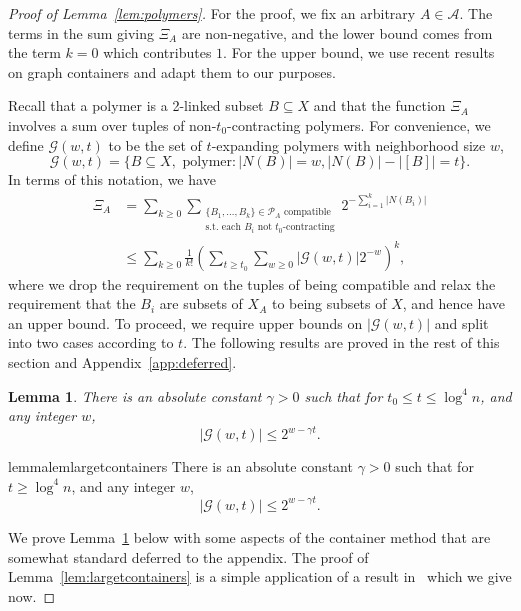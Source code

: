 \documentclass[11pt,letterpaper]{amsart}
\newtheorem{lemma}[theorem]{Lemma}
\theoremstyle{definition}
\renewcommand{\subset}{\subseteq}
\begin{document}
\begin{proof}[Proof of Lemma~\ref{lem:polymers}]
For the proof, we fix an arbitrary $A\in\mathcal A$. 
The terms in the sum giving $\Xi_A$ are non-negative, and the lower bound comes from the term $k=0$ which contributes $1$.
For the upper bound, we use recent results on graph containers and adapt them to our purposes.

Recall that a polymer is a 2-linked subset $B\subset X$ and that the function $\Xi_A$ involves a sum over tuples of non-$t_0$-contracting polymers. 
For convenience, we define $\mathcal{G}(w,t)$ to be the set of $t$-expanding polymers with neighborhood size $w$,
\[
\mathcal{G}(w,t) = \{B \subseteq X,\text{ polymer}:|N(B)| = w, |N(B)| - |[B]| = t\}.
\]
In terms of this notation, we have
\begin{align}
 \Xi_A &= \sum_{k\ge 0}\sum_{\substack{\{B_1,\dotsc,B_k\}\in\mathcal{P}_A\text{ compatible}\\\text{s.t.\ each $B_i$ not $t_0$-contracting}}} 2^{-\sum_{i=1}^k |N(B_i)|}
 \\&\le \sum_{k\ge 0}\frac{1}{k!}\left(\sum_{t\ge t_0}\sum_{w\ge 0}|\mathcal{G}(w,t)|2^{-w}\right)^k,
\end{align}
where we drop the requirement on the tuples of being compatible and relax the requirement that the $B_i$ are subsets of $X_A$ to being subsets of $X$, and hence have an upper bound. 
To proceed, we require upper bounds on $|\mathcal{G}(w,t)|$ and split into two cases according to $t$. The following results are proved in the rest of this section and Appendix~\ref{app:deferred}.

\begin{lemma}\label{lem:smalltcontainers}
There is an absolute constant $\gamma>0$ such that for $t_0\leq t \leq \log^4 n$, and any integer $w$,
\[
|\mathcal{G}(w,t)| \leq 2^{w - \gamma t}.
\]
\end{lemma}

\begin{restatable}{lemma}{lemlargetcontainers}\label{lem:largetcontainers}
There is an absolute constant $\gamma>0$ such that for $t \geq \log^4 n$, and any integer $w$,
\[
|\mathcal{G}(w,t)| \leq 2^{w - \gamma t}.
\]
\end{restatable}

We prove Lemma~\ref{lem:smalltcontainers} below with some aspects of the container method that are somewhat standard deferred to the appendix. The proof of Lemma~\ref{lem:largetcontainers} is a simple application of a result in~\cite{JPP22} which we give now.


\end{proof}
\end{document}
